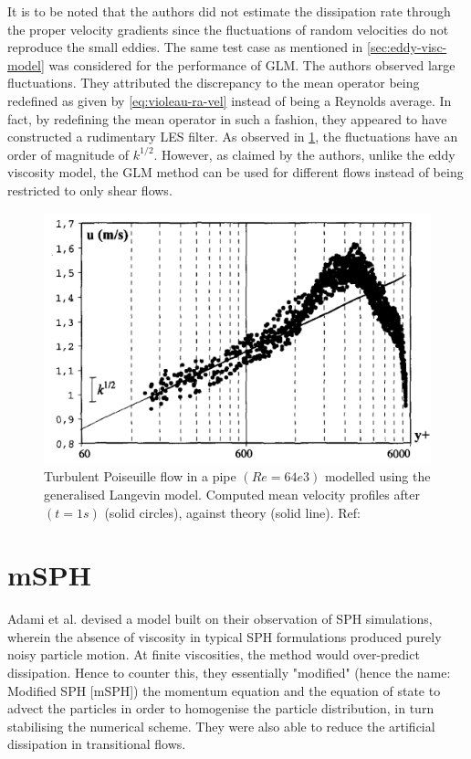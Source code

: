 It is to be noted that the authors did not estimate the dissipation rate through the proper velocity gradients since the fluctuations of random velocities do not reproduce the small eddies.
The same test case as mentioned in \ref{sec:eddy-visc-model} was considered for the performance of GLM. 
The authors observed large fluctuations. They attributed the discrepancy to the mean operator being redefined as given by \ref{eq:violeau-ra-vel} instead of being a Reynolds average. In fact, by redefining the mean operator in such a fashion, they appeared to have constructed a rudimentary LES filter. 
As observed in \ref{fig:violeau2002-GLM-result}, the fluctuations have an order of magnitude of $k^{1/2}$. However, as claimed by the authors, unlike the eddy viscosity model, the GLM method can be used for different flows instead of being restricted to only shear flows.
\begin{figure}[h!]
	\centering
	\includegraphics{Figures/research_papers/violeau2002-GLM-result.png}
	\caption{Turbulent Poiseuille flow in a pipe $(Re = 64e3)$ modelled using the generalised Langevin model. Computed mean velocity profiles after $(t=1s)$ (solid circles), against theory (solid line). Ref: \parencite{VIOLEAU2002}}
	\label{fig:violeau2002-GLM-result}
\end{figure}


\section{mSPH}
Adami et al. \parencite{Adami2012} devised a model built on their observation of SPH simulations, wherein the absence of viscosity in typical SPH formulations produced purely noisy particle motion. At finite viscosities, the method would over-predict dissipation. Hence to counter this, they essentially "modified" (hence the name: Modified SPH [mSPH]) the momentum equation and the equation of state to advect the particles in order to homogenise the particle distribution, in turn stabilising the numerical scheme. They were also able to reduce the artificial dissipation in transitional flows.

